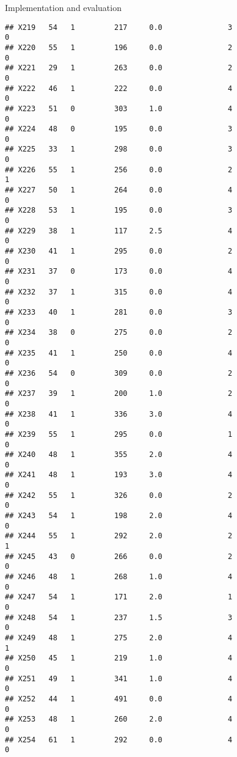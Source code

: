 \documentclass[
  ignorenonframetext,
]{beamer}
\begin{document}
\begin{frame}[fragile]{Implementation and evaluation}
\begin{verbatim}
## X219   54   1         217     0.0               3                   0
## X220   55   1         196     0.0               2                   0
## X221   29   1         263     0.0               2                   0
## X222   46   1         222     0.0               4                   0
## X223   51   0         303     1.0               4                   0
## X224   48   0         195     0.0               3                   0
## X225   33   1         298     0.0               3                   0
## X226   55   1         256     0.0               2                   1
## X227   50   1         264     0.0               4                   0
## X228   53   1         195     0.0               3                   0
## X229   38   1         117     2.5               4                   0
## X230   41   1         295     0.0               2                   0
## X231   37   0         173     0.0               4                   0
## X232   37   1         315     0.0               4                   0
## X233   40   1         281     0.0               3                   0
## X234   38   0         275     0.0               2                   0
## X235   41   1         250     0.0               4                   0
## X236   54   0         309     0.0               2                   0
## X237   39   1         200     1.0               2                   0
## X238   41   1         336     3.0               4                   0
## X239   55   1         295     0.0               1                   0
## X240   48   1         355     2.0               4                   0
## X241   48   1         193     3.0               4                   0
## X242   55   1         326     0.0               2                   0
## X243   54   1         198     2.0               4                   0
## X244   55   1         292     2.0               2                   1
## X245   43   0         266     0.0               2                   0
## X246   48   1         268     1.0               4                   0
## X247   54   1         171     2.0               1                   0
## X248   54   1         237     1.5               3                   0
## X249   48   1         275     2.0               4                   1
## X250   45   1         219     1.0               4                   0
## X251   49   1         341     1.0               4                   0
## X252   44   1         491     0.0               4                   0
## X253   48   1         260     2.0               4                   0
## X254   61   1         292     0.0               4                   0

\end{verbatim}
\end{frame}
\end{document}
